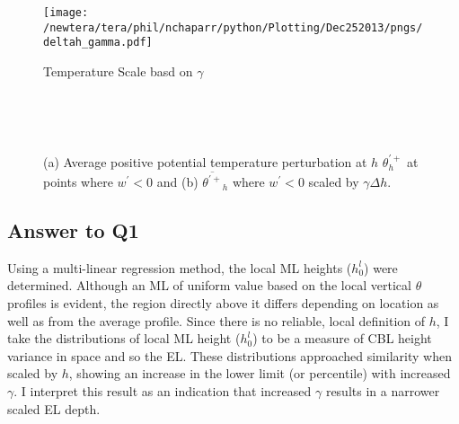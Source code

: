\begin{figure}[htbp]
    \centering
    \texttt{[image: /newtera/tera/phil/nchaparr/python/Plotting/Dec252013/pngs/deltah\_gamma.pdf]}
    \caption[Temperature Scale basd on $\gamma$]{Temperature Scale basd on $\gamma$}
    \label{fig:deltahgamma}   %
\end{figure}



\begin{figure}[htbp]
\begin{minipage}[b]{0.5\linewidth}
        \\
        \end{minipage}             
\quad
\begin{minipage}[b]{0.5\linewidth}
        \\      
       \end{minipage}
        \caption[Positive potential temperature perturbation at $h$ (ii)]{(a) Average positive potential temperature perturbation at $h$ $\theta^{\prime+}_{h}$ at points where $w^{\prime}<0$ and (b) $\overline{\theta^{\prime+}}_{h}$ where $w^{\prime}<0$ scaled by $\gamma \Delta h$.}
        \label{fig:downwarm_theta1}
\end{figure}

\subsection{Answer to Q1}

Using a multi-linear regression method, the local \acs{ML} heights ($h^{l}_{0}$) 
were determined.  Although an \acs{ML} of uniform value based on the local vertical $\theta$ profiles 
is evident, the region directly above it differs depending on location as well as from the average profile. 
Since there is no reliable, local definition of $h$, 
I take the distributions of local \acs{ML} height ($h^{l}_{0}$) to be a measure of \acs{CBL} height variance in space and so the \acs{EL}.
 These distributions approached similarity when scaled by $h$, showing an increase in the lower 
limit (or percentile) with increased $\gamma$.  I interpret this result as an indication that increased $\gamma$ results in a narrower scaled \acs{EL} depth.\\

